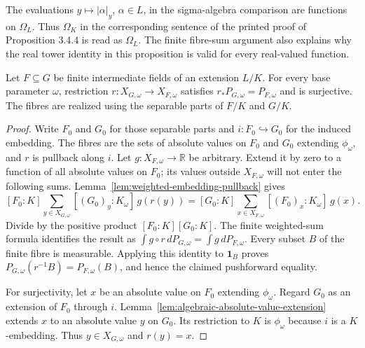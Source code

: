 \begin{remark}
\label{rem:finite-tower-evaluation-domain}
The evaluations $y\mapsto|\alpha|_y$, $\alpha\in L$, in the
sigma-algebra comparison are functions on $\Omega_L$. Thus
$\Omega_K$ in the corresponding sentence of the printed proof of
Proposition 3.4.4 is read as $\Omega_L$. The finite fibre-sum argument
also explains why the real tower identity in this proposition is
valid for every real-valued function.
\end{remark}

\begin{lemma}
\label{lem:finite-fibre-marginal}
\leanok
{}
Let $F\subseteq G$ be finite intermediate fields of an extension $L/K$.
For every base parameter $\omega$, restriction
$r:X_{G,\omega}\to X_{F,\omega}$ satisfies
$r_*P_{G,\omega}=P_{F,\omega}$ and is surjective.
The fibres are realized using the separable parts of $F/K$ and $G/K$.
\end{lemma}
\begin{proof}
Write $F_0$ and $G_0$ for those separable parts and
$i:F_0\hookrightarrow G_0$ for the induced embedding.
The fibres are the sets of absolute values on $F_0$ and $G_0$
extending $\phi_\omega$, and $r$ is pullback along $i$.
Let $g:X_{F,\omega}\to\mathbb R$ be arbitrary. Extend it by zero
to a function of all absolute values on $F_0$; its values outside
$X_{F,\omega}$ will not enter the following sums.
Lemma~\ref{lem:weighted-embedding-pullback} gives
\[
 [F_0:K]\sum_{y\in X_{G,\omega}}[(G_0)_y:K_\omega]\,g(r(y))
 =[G_0:K]\sum_{x\in X_{F,\omega}}[(F_0)_x:K_\omega]\,g(x).
\]
Divide by the positive product $[F_0:K][G_0:K]$.
The finite weighted-sum formula identifies the result as
$\int g\circ r\,dP_{G,\omega}=\int g\,dP_{F,\omega}$.
Every subset $B$ of the finite fibre is measurable. Applying this
identity to $\mathbf1_B$ proves
$P_{G,\omega}(r^{-1}B)=P_{F,\omega}(B)$, and hence the claimed
pushforward equality.

For surjectivity, let $x$ be an absolute value on $F_0$ extending
$\phi_\omega$. Regard $G_0$ as an extension of $F_0$ through $i$.
Lemma~\ref{lem:algebraic-absolute-value-extension} extends $x$ to an
absolute value $y$ on $G_0$. Its restriction to $K$ is $\phi_\omega$
because $i$ is a $K$-embedding. Thus $y\in X_{G,\omega}$ and
$r(y)=x$.
\end{proof}

